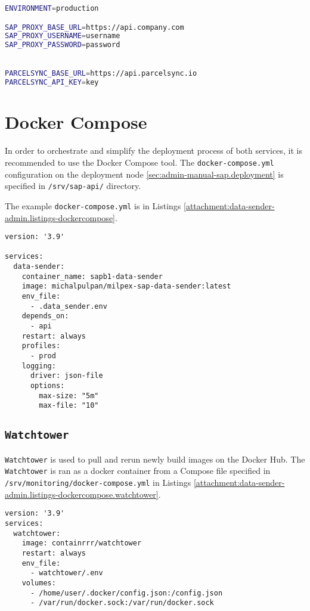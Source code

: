 \begin{lstlisting}[language=bash,caption={Data sender environment configuration}]
ENVIRONMENT=production

SAP_PROXY_BASE_URL=https://api.company.com
SAP_PROXY_USERNAME=username
SAP_PROXY_PASSWORD=password


PARCELSYNC_BASE_URL=https://api.parcelsync.io
PARCELSYNC_API_KEY=key
\end{lstlisting}
\label{attachment:data-sender-admin.listings-evn}


\section{Docker Compose}
In order to orchestrate and simplify the deployment process of both services, it is recommended to use the Docker Compose tool.
The \texttt{docker-compose.yml} configuration on the deployment node \ref{sec:admin-manual-sap.deployment} is specified in \texttt{/srv/sap-api/} directory.

The example \texttt{docker-compose.yml} is in Listings \ref{attachment:data-sender-admin.listings-dockercompose}.
\begin{lstlisting}[caption={Data-sender \texttt{docker-compose.yml}}]
version: '3.9'

services:
  data-sender:
    container_name: sapb1-data-sender
    image: michalpulpan/milpex-sap-data-sender:latest
    env_file:
      - .data_sender.env
    depends_on:
      - api
    restart: always
    profiles:
      - prod
    logging:
      driver: json-file
      options:
        max-size: "5m"
        max-file: "10"

\end{lstlisting}
\label{attachment:data-sender-admin.listings-dockercompose}
\subsection{\texttt{Watchtower}}
\texttt{Watchtower} is used to pull and rerun newly build images on the Docker Hub.
The \texttt{Watchtower} is ran as a docker container from a Compose file specified in \texttt{/srv/monitoring/docker-compose.yml} in Listings \ref{attachment:data-sender-admin.listings-dockercompose.watchtower}.

\begin{lstlisting}[caption={Watchtower \texttt{docker-compose.yml}}]
version: '3.9'
services:
  watchtower:
    image: containrrr/watchtower
    restart: always
    env_file:
      - watchtower/.env
    volumes:
      - /home/user/.docker/config.json:/config.json
      - /var/run/docker.sock:/var/run/docker.sock
\end{lstlisting}
\label{attachment:data-sender-admin.listings-dockercompose.watchtower}

